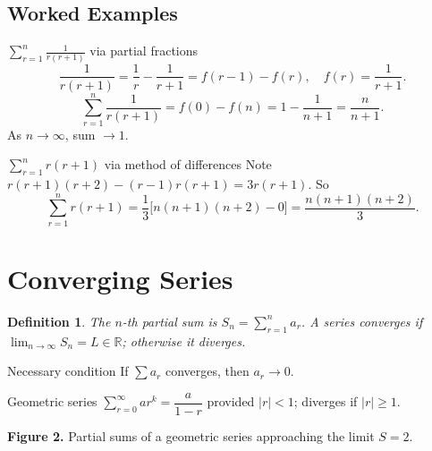 \documentclass[12pt,a4paper]{article}
\theoremstyle{defstyle}
\newtheorem{definition}{Definition}[section]
\newcommand{\ds}{\displaystyle}
\newcommand{\sumr}{\sum_{r=1}^{n}}
\newcommand{\R}{\mathbb{R}}
\begin{document}
\subsection{Worked Examples}

\begin{example}{$\displaystyle\sumr \frac{1}{r(r+1)}$ via partial fractions}{}
\[
  \frac{1}{r(r+1)}=\frac{1}{r}-\frac{1}{r+1} = f(r-1)-f(r),\quad f(r)=\frac{1}{r+1}.
\]
\[
  \sumr\frac{1}{r(r+1)} = f(0)-f(n) = 1-\frac{1}{n+1} = \frac{n}{n+1}.
\]
As \(n\to\infty\), sum \(\to 1\).
\end{example}

\begin{example}{$\displaystyle\sumr r(r+1)$ via method of differences}{}
Note \(r(r+1)(r+2)-(r-1)r(r+1)=3r(r+1)\). So
\[
  \sumr r(r+1) = \frac{1}{3}\bigl[n(n+1)(n+2)-0\bigr]=\frac{n(n+1)(n+2)}{3}.
\]
\end{example}

\section{Converging Series}

\begin{definition}
The \(n\)-th partial sum is \(S_n=\sumr a_r\). A series \emph{converges} if
\(\lim_{n\to\infty}S_n = L\in\R\); otherwise it \emph{diverges}.
\end{definition}

\begin{result}{Necessary condition}{}
If \(\sum a_r\) converges, then \(a_r\to 0\).
\end{result}

\begin{result}{Geometric series}{}
\(\ds\sum_{r=0}^{\infty}ar^k = \dfrac{a}{1-r}\) provided \(|r|<1\); diverges if \(|r|\geq1\).
\end{result}

\vspace{6pt}
\begin{center}
\end{center}
\noindent\textbf{Figure 2.} Partial sums of a geometric series approaching the limit \(S=2\).
\end{document}
